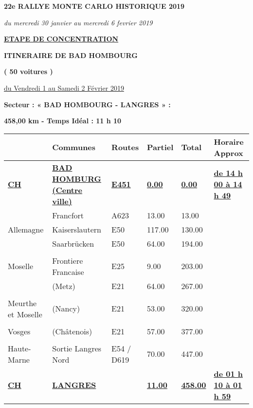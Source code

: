 \documentclass{article}%
\begin{document}
%
\normalsize%
\begin{center} \textbf{\LARGE{22e RALLYE MONTE CARLO HISTORIQUE 2019}} \end{center}%
\begin{center} \textit{du mercredi 30 janvier au mercredi 6 fevrier 2019} \end{center}%
\begin{center} \textbf{\underline{ETAPE DE CONCENTRATION}} \end{center}%
\begin{center} \textbf{ITINERAIRE DE BAD HOMBOURG} \end{center}%
\begin{center} \textbf{( 50 voitures )} \end{center}%
\begin{flushright} \underline{du  Vendredi 1 au Samedi 2 Février 2019} \end{flushright}%
\begin{flushleft} \textbf{Secteur : « BAD HOMBOURG - LANGRES  » :
} \end{flushleft}%
\begin{flushright} \textbf{458,00 km - Temps Idéal : 11 h 10} \end{flushright}%
\begin{longtable}{p{2.25cm}|p{5.7cm}|p{3.0cm}|p{1.5cm}|p{1.5cm}|p{3.5cm}}%
\hline%
&Communes&Routes&Partiel&Total&Horaire Approx\\%
\hline%
\endhead%
\endfoot%
\endlastfoot%
\textbf{\underline{﻿CH}}&\textbf{\underline{BAD HOMBURG                        (Centre ville)}}&\textbf{\underline{E451}}&\textbf{\underline{0.00}}&\textbf{\underline{0.00}}&\textbf{\underline{de 14 h 00 à 14 h 49}}\\%
 &Francfort&A623&13.00&13.00& \\%
Allemagne&Kaiserslautern &E50 &117.00&130.00& \\%
 &Saarbrücken&E50 &64.00&194.00& \\%
\hline& & & & & \\%
Moselle&Frontiere Francaise&E25&9.00&203.00& \\%
 &(Metz)&E21 &64.00&267.00& \\%
\hline& & & & & \\%
 Meurthe et Moselle&(Nancy) &E21 &53.00&320.00& \\%
\hline& & & & & \\%
Vosges &(Châtenois)&E21 &57.00&377.00& \\%
\hline& & & & & \\%
Haute-Marne&Sortie Langres Nord&E54 / D619&70.00&447.00& \\%
\textbf{\underline{                                CH}}&\textbf{\underline{LANGRES}}& &\textbf{\underline{11.00}}&\textbf{\underline{458.00}}&\textbf{\underline{de 01 h 10 à 01 h 59}}\\%
\hline%
\end{longtable}%
\begin{flushleft} \textit{} \end{flushleft}%
\end{document}
